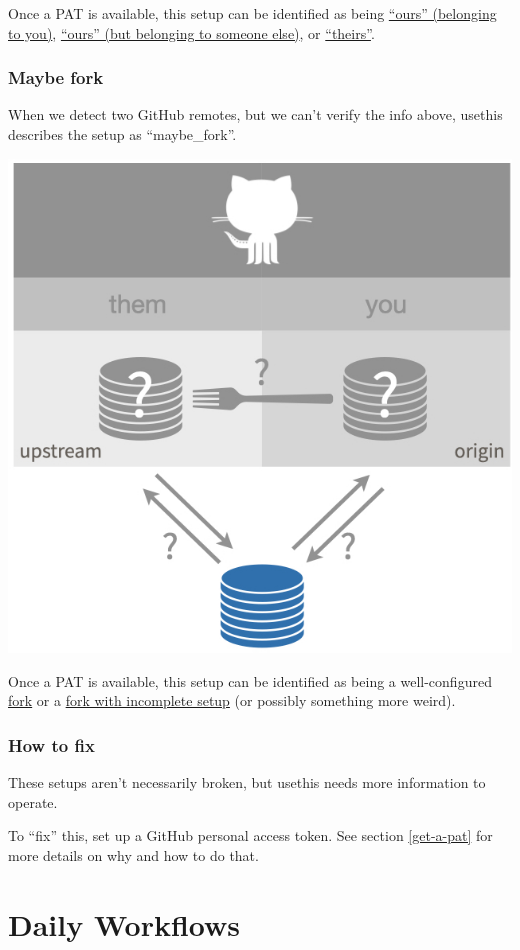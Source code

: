 \documentclass[
]{book}
\begin{document}
Once a PAT is available, this setup can be identified as being \hyperref[ours-you]{``ours'' (belonging to you)}, \hyperref[ours-them]{``ours'' (but belonging to someone else)}, or \hyperref[theirs]{``theirs''}.

\section{Maybe fork}\label{maybe-fork}

When we detect two GitHub remotes, but we can't verify the info above, usethis describes the setup as ``maybe\_fork''.

\begin{center}\includegraphics[width=0.6\linewidth]{img/maybe_fork} \end{center}

Once a PAT is available, this setup can be identified as being a well-configured \hyperref[fork-them]{fork} or a \hyperref[fork_upstream_is_not_origin_parent]{fork with incomplete setup} (or possibly something more weird).

\section{How to fix}\label{how-to-fix}

These setups aren't necessarily broken, but usethis needs more information to operate.

To ``fix'' this, set up a GitHub personal access token.
See section \ref{get-a-pat} for more details on why and how to do that.

\part{Daily Workflows}\label{part-daily-workflows}
\end{document}
